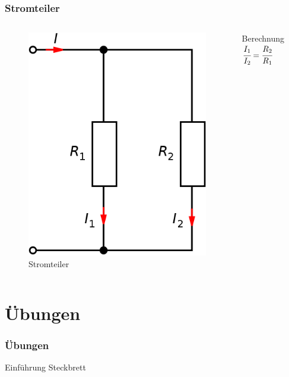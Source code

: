 \begin{frame}
	\frametitle{Stromteiler}
	\begin{columns}
		\begin{center}
			\begin{figure}
				\includegraphics[width=.6\textwidth,height=.75\textheight,keepaspectratio]{e04/Stromteiler.png}
				\caption{Stromteiler \cite{stromteiler}}
				\label{fig_stromteiler}
			\end{figure}
		\end{center}
		\begin{block}{Berechnung}
			$\cfrac{I_1}{I_2} = \cfrac{R_2}{R_1}$
		\end{block}
	\end{columns}
\end{frame}


\section*{Übungen}

\begin{frame}
  \frametitle{Übungen}
  \begin{center}
    Einführung Steckbrett
  \end{center}
\end{frame}

